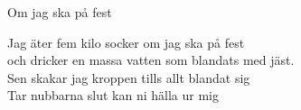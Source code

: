\begin{song}{Om jag ska på fest}

	
	
	Jag äter fem kilo socker om jag ska på fest\\
	och dricker en massa vatten som blandats med jäst.\\
	Sen skakar jag kroppen tills allt blandat sig\\
	Tar nubbarna slut kan ni hälla ur mig

\end{song}
